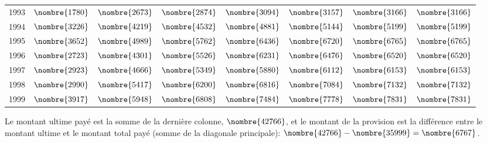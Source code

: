 \begin{exercice}
\begin{sol}
\begin{enumerate}
\begin{center}
\begin{tabular}{|l|l l l l l l l|}
          1993& $\nombre{1780}$& $\nombre{2673}$& $\nombre{2874}$& $\nombre{3094}$& $\nombre{3157}$& $\nombre{3166}$& $\nombre{3166}$ \\
          1994& $\nombre{3226}$& $\nombre{4219}$& $\nombre{4532}$& $\nombre{4881}$& $\nombre{5144}$& $\nombre{5199}$& $\nombre{5199}$ \\
          1995& $\nombre{3652}$& $\nombre{4989}$& $\nombre{5762}$& $\nombre{6436}$& $\nombre{6720}$& $\nombre{6765}$& $\nombre{6765}$ \\
          1996& $\nombre{2723}$& $\nombre{4301}$& $\nombre{5526}$& $\nombre{6231}$& $\nombre{6476}$& $\nombre{6520}$& $\nombre{6520}$ \\
          1997& $\nombre{2923}$& $\nombre{4666}$& $\nombre{5349}$& $\nombre{5880}$& $\nombre{6112}$& $\nombre{6153}$& $\nombre{6153}$ \\
          1998& $\nombre{2990}$& $\nombre{5417}$& $\nombre{6200}$& $\nombre{6816}$& $\nombre{7084}$& $\nombre{7132}$& $\nombre{7132}$ \\
          1999& $\nombre{3917}$& $\nombre{5948}$& $\nombre{6808}$& $\nombre{7484}$& $\nombre{7778}$& $\nombre{7831}$& $\nombre{7831}$\\\hline
        \end{tabular}
      \end{center}
      Le montant ultime payé est la somme de la dernière colonne,
      $\nombre{42766}$, et le montant de la provision est la
      différence entre le montant ultime et le montant total payé
      (somme de la diagonale principale):
      $\nombre{42766} - \nombre{35999} = \nombre{6767}$.
    \end{enumerate}
  \end{sol}
\end{exercice}

